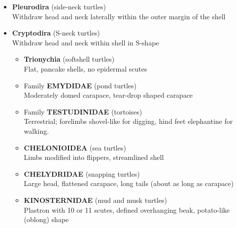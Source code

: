 \documentclass[a4paper,12pt]{article}
\begin{document}
\begin{description}
\begin{itemize}
  \item{\textbf{Pleurodira} (side-neck turtles)} \\ Withdraw head and neck laterally within the outer margin of the shell
  \item{\textbf{Cryptodira} (S-neck turtles)} \\ Withdraw head and neck within shell in S-shape
  \begin{itemize}
    \item {\textbf{Trionychia} (softshell turtles)} \\ Flat, pancake shells, no epidermal scutes
    \item Family {\textbf{EMYDIDAE} (pond turtles)} \\ Moderately domed carapace, tear-drop shaped carapace
    \item Family {\textbf{TESTUDINIDAE} (tortoises)} \\ Terrestrial; forelimbs shovel-like for digging, hind feet elephantine for walking.
    \item {\textbf{CHELONIOIDEA} (sea turtles)} \\ Limbs modified into flippers, streamlined shell
    \item {\textbf{CHELYDRIDAE} (snapping turtles)} \\ Large head, flattened carapace, long tails (about as long as carapace)
    \item {\textbf{KINOSTERNIDAE} (mud and musk turtles)} \\ Plastron with 10 or 11 scutes, defined overhanging beak, potato-like (oblong) shape
  \end{itemize}
\end{itemize}
\end{description}
\end{document}
